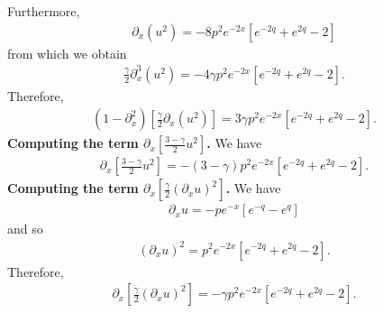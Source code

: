 \documentclass[12pt,reqno]{amsart}
\numberwithin{equation}{section}  %
\numberwithin{figure}{section}
\newcommand{\p}{\partial}
\theoremstyle{plain}  %
\theoremstyle{definition}
\begin{document}
%
%
Furthermore,
%
%
\begin{equation*}
  \begin{split}
    \p_x(u^{2}) = -8p^{2}e^{-2x}\left[ e^{-2q} + e^{2q}-2 \right]
  \end{split}
\end{equation*}
%
%
from which we obtain
%
%
\begin{equation*}
  \begin{split}
    \frac{\gamma}{2} \p_x^3(u^{2}) = -4 \gamma p^{2}e^{-2x}\left[ e^{-2q}+
    e^{2q} -2
    \right].
  \end{split}
\end{equation*}
%
%
Therefore,
%
%
\begin{equation}
  \label{pseudo-dx-u-sq}
  \begin{split}
    \left( 1 - \p_x^2 \right)\left[ \frac{\gamma}{2} \p_x(u^{2}) \right] =
    3\gamma p^{2} e^{-2x}\left[ e^{-2q} + e^{2q}-2 \right].
  \end{split}
\end{equation}
%
%
{\bf Computing the term $ \displaystyle \p_x \left[ \frac{3-\gamma}{2}u^{2} \right] $.}
We have
%
%
\begin{equation}
  \label{pseudo-dx-3-gam-u-sq}
  \begin{split}
    \p_x \left[ \frac{3-\gamma}{2}u^{2} \right] = -(3- \gamma)p^{2}e^{-2x}\left[
    e^{-2q} + e^{2q}-2 \right].
  \end{split}
\end{equation}
%
%
{\bf Computing the term $\displaystyle \p_x \left[ \frac{\gamma}{2}(\p_x
u)^{2} \right]$.}
We have
%
%
\begin{equation*}
  \begin{split}
    \p_x u = -p e^{-x}\left[ e^{-q} - e^{q} \right]
  \end{split}
\end{equation*}
%
%
and so
%
%
\begin{equation*}
  \begin{split}
    (\p_x u)^{2} = p^{2} e^{-2x}\left[ e^{-2q} + e^{2q} -2 \right].
  \end{split}
\end{equation*}
%
%
Therefore,
%
%
%
%
\begin{equation}
  \label{del-x-delx-u-sq}
  \begin{split}
    \p_x\left[ \frac{\gamma}{2}(\p_x u )^{2}\right] = - \gamma p^{2}e^{-2x}\left[
    e^{-2q} + e^{2q} -2 \right].
  \end{split}
\end{equation}
\end{document}

